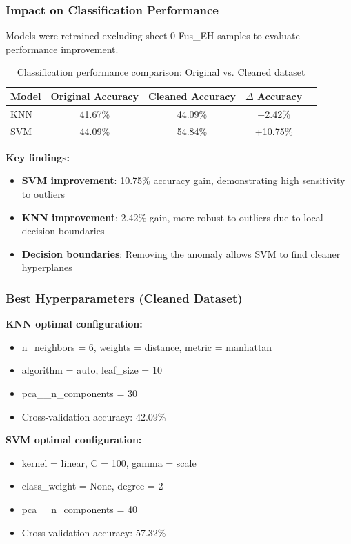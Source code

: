 \documentclass[12pt,a4paper]{article}
\begin{document}
\subsubsection{Impact on Classification Performance}

Models were retrained excluding sheet 0 Fus\_EH samples to evaluate performance improvement.

\begin{table}[H]
\centering
\caption{Classification performance comparison: Original vs. Cleaned dataset}
\label{tab:model_performance_cleaned}
\begin{tabular}{lcccc}
\toprule
\textbf{Model} & \textbf{Original Accuracy} & \textbf{Cleaned Accuracy} & \textbf{$\Delta$ Accuracy} \\
\midrule
KNN & 41.67\% & 44.09\% & +2.42\% \\
SVM & 44.09\% & 54.84\% & +10.75\% \\
\bottomrule
\end{tabular}
\end{table}

\textbf{Key findings:}
\begin{itemize}
    \item \textbf{SVM improvement}: 10.75\% accuracy gain, demonstrating high sensitivity to outliers
    \item \textbf{KNN improvement}: 2.42\% gain, more robust to outliers due to local decision boundaries
    \item \textbf{Decision boundaries}: Removing the anomaly allows SVM to find cleaner hyperplanes
\end{itemize}

\subsubsection{Best Hyperparameters (Cleaned Dataset)}

\textbf{KNN optimal configuration:}
\begin{itemize}
    \item n\_neighbors = 6, weights = distance, metric = manhattan
    \item algorithm = auto, leaf\_size = 10
    \item pca\_\_n\_components = 30
    \item Cross-validation accuracy: 42.09\%
\end{itemize}

\textbf{SVM optimal configuration:}
\begin{itemize}
    \item kernel = linear, C = 100, gamma = scale
    \item class\_weight = None, degree = 2
    \item pca\_\_n\_components = 40
    \item Cross-validation accuracy: 57.32\%
\end{itemize}
\end{document}
